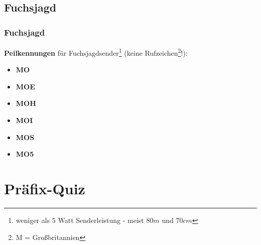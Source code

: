 \subsection{Fuchsjagd}

\begin{frame}
    \frametitle{Fuchsjagd}
    
    \textbf{Peilkennungen} für Fuchsjagdsender\footnote{weniger als 5 Watt
    Senderleistung - meist $80m$ und $70cm$} (keine Rufzeichen\footnote{M = Großbritannien}!):
  
    \begin{itemize}
        \item \textbf{MO}
        \item \textbf{MOE}
        \item \textbf{MOH}
        \item \textbf{MOI}
        \item \textbf{MOS}
        \item \textbf{MO5}
    \end{itemize}

\end{frame}

\section{Präfix-Quiz}

